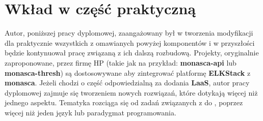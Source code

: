 \section{Wkład w część praktyczną}
\label{chapter:application_own:own_work}

Autor, poniższej pracy dyplomowej, zaangażowany był w tworzenia modyfikacji dla praktycznie wszystkich z omawianych powyżej komponentów i w przyszłości będzie kontynuował pracę związaną z ich dalszą rozbudową.
Projekty, oryginalnie zaproponowane, przez firmę HP (takie jak na przykład: \textbf{monasca-api} lub \textbf{monasca-thresh})
są dostosowywane aby zintegrować platformę \textbf{ELKStack} z \textbf{monasca}.
Jeżeli chodzi o część odpowiedzialną za dodania \textbf{LaaS}, autor pracy dyplomowej zajmuje się
tworzeniem nowych rozwiązań, które dotykają więcej niż jednego aspektu. Tematyka rozciąga się
od zadań związanych z  
do , poprzez więcej niż jeden język lub paradygmat programowania.

